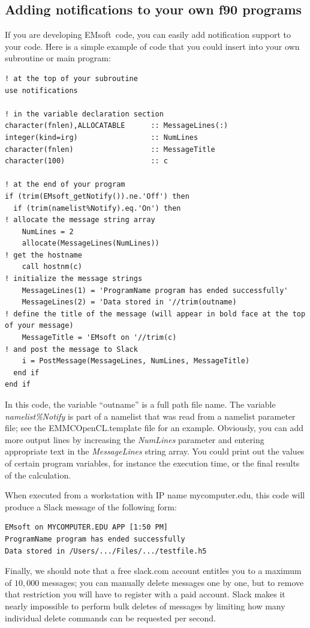 \documentclass[DIV=calc, paper=letter, fontsize=11pt]{scrartcl}	 %
\newcommand{\ctp}{\textsf{EMsoft}}
\begin{document}
\subsection{Adding notifications to your own f90 programs}
If you are developing \ctp\ code, you can easily add notification support to your code.  Here is a simple example of code that you could insert into your own subroutine or main program:
\begin{verbatim}
! at the top of your subroutine
use notifications

! in the variable declaration section
character(fnlen),ALLOCATABLE      :: MessageLines(:)
integer(kind=irg)                 :: NumLines
character(fnlen)                  :: MessageTitle
character(100)                    :: c

! at the end of your program
if (trim(EMsoft_getNotify()).ne.'Off') then
  if (trim(namelist%Notify).eq.'On') then 
! allocate the message string array  
    NumLines = 2
    allocate(MessageLines(NumLines))
! get the hostname
    call hostnm(c)
! initialize the message strings 
    MessageLines(1) = 'ProgramName program has ended successfully'
    MessageLines(2) = 'Data stored in '//trim(outname)
! define the title of the message (will appear in bold face at the top of your message)
    MessageTitle = 'EMsoft on '//trim(c)
! and post the message to Slack    
    i = PostMessage(MessageLines, NumLines, MessageTitle)
  end if
end if
\end{verbatim}
In this code, the variable ``outname'' is a full path file name.  The variable \textit{namelist\%Notify} is part of a namelist that was read
from a namelist parameter file;  see the \textsf{EMMCOpenCL.template} file for an example.  Obviously, you can add more output lines
by increasing the \textit{NumLines} parameter and entering appropriate text in the \textit{MessageLines} string array.  You could print out the 
values of certain program variables, for instance the execution time, or the final results of the calculation.

When executed from a workstation with IP name \textsf{mycomputer.edu}, this code will produce a Slack message of the following form:
\begin{verbatim}
EMsoft on MYCOMPUTER.EDU APP [1:50 PM] 
ProgramName program has ended successfully
Data stored in /Users/.../Files/.../testfile.h5
\end{verbatim}

Finally, we should note that a free slack.com account entitles you to a maximum of $10,000$ messages; you can manually delete messages one by one, but
to remove that restriction you will have to register with a paid account.  Slack makes it nearly impossible to perform bulk deletes of messages by limiting how 
many individual delete commands can be requested per second.
\end{document}
